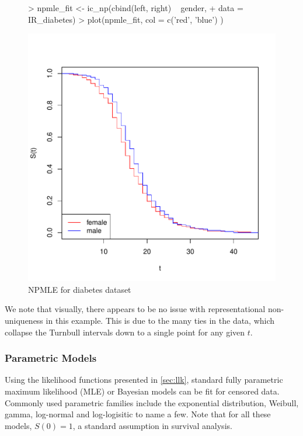 \documentclass[a4paper]{article}
\begin{document}
\begin{figure}[H]
\begin{center}
\begin{Schunk}
\begin{Sinput}
> npmle_fit <- ic_np(cbind(left, right) ~ gender, 
+                    data = IR_diabetes)
> plot(npmle_fit, col = c('red', 'blue') )
\end{Sinput}
\end{Schunk}
\includegraphics{StatisticalBackground-005}
\caption{NPMLE for diabetes dataset}
\label{fig:NPMLE_diab}
\end{center}
\end{figure}

We note that visually, there appears to be no issue with representational non-uniqueness in this example. This is due to the many ties in the data, which collapse the Turnbull intervals down to a single point for any given $t$. 

  \subsubsection{Parametric Models}

  Using the likelihood functions presented in \ref{sec:llk}, standard fully parametric maximum likelihood (MLE) or Bayesian models can be fit for censored data. Commonly used parametric families include the exponential distribution, Weibull, gamma, log-normal and log-logisitic to name a few. Note that for all these models, $S(0) = 1$, a standard assumption in survival analysis. 
  
\end{document}
